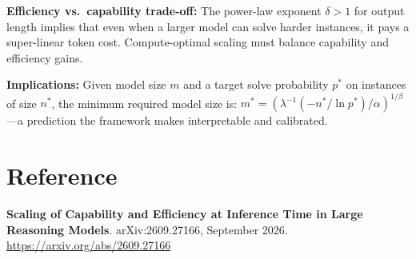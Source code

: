 \documentclass[10pt,twocolumn]{article}
\begin{document}
\textbf{Efficiency vs.\ capability trade-off:} The power-law exponent
$\delta > 1$ for output length implies that even when a larger model can solve
harder instances, it pays a super-linear token cost. Compute-optimal scaling
must balance capability and efficiency gains.

\textbf{Implications:} Given model size $m$ and a target solve probability
$p^*$ on instances of size $n^*$, the minimum required model size is:
$m^* = (\lambda^{-1}(-n^*/\ln p^*)/\alpha)^{1/\beta}$---a prediction the
framework makes interpretable and calibrated.

\section*{Reference}

\textbf{Scaling of Capability and Efficiency at Inference Time in Large
Reasoning Models}. arXiv:2609.27166, September 2026.\\
\url{https://arxiv.org/abs/2609.27166}
\end{document}
